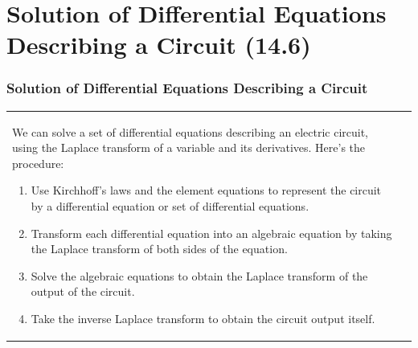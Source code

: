 \documentclass[aspectratio=169]{beamer}
\begin{document}
\section{Solution of Differential Equations Describing a Circuit (14.6)}
\begin{frame}[fragile]
	\frametitle{Solution of Differential Equations Describing a Circuit}
\begin{tabular}{ll}

	\begin{columns}
	\small	\begin{column}{1\textwidth}  %

	We can solve a set of differential equations describing an electric circuit, using the Laplace transform of
a variable and its derivatives. Here’s the procedure:
	
	
	\small		\begin{enumerate}
\item{Use Kirchhoff’s laws and the element equations to represent the circuit by a differential equation or
set of differential equations.\newline}
\item{Transform each differential equation into an algebraic equation by taking the Laplace transform of
both sides of the equation.\newline}
\item{Solve the algebraic equations to obtain the Laplace transform of the output of the circuit.\newline}
\item{Take the inverse Laplace transform to obtain the circuit output itself.\newline}
					\end{enumerate}				
		\end{column}
	\end{columns}\\
\end{tabular}
\end{frame}
\end{document}
